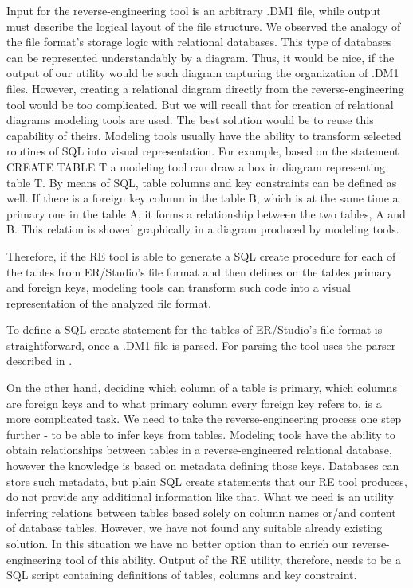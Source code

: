 Input for the reverse-engineering tool is an arbitrary .DM1 file, while output must describe the logical layout of the file structure.
We observed the analogy of the file format's storage logic with relational databases. 
This type of databases can be represented understandably by a diagram.
Thus, it would be nice, if the output of our utility would be such diagram capturing the organization of .DM1 files.
However, creating a relational diagram directly from the reverse-engineering tool would be too complicated. But we will recall that for creation of relational diagrams modeling tools are used. The best solution would be to reuse this capability of theirs.
Modeling tools usually have the ability to transform selected routines of SQL into visual representation.
For example, based on the statement CREATE TABLE T a modeling tool can draw a box in diagram representing table T. 
By means of SQL, table columns and key constraints can be defined as well.
If there is a foreign key column in the table B, which is at the same time a primary one in the table A, it forms a relationship between the two tables, A and B. This relation is showed graphically in a diagram produced by modeling tools.

Therefore, if the RE tool is able to generate a SQL create procedure for each of the tables from ER/Studio's file format and then defines on the tables primary and foreign keys, modeling tools can transform such code into a visual representation of the analyzed file format.

To define a SQL create statement for the tables of ER/Studio's file format is straightforward, once a .DM1 file is parsed. For parsing the tool uses the parser described in .

On the other hand, deciding which column of a table is primary, which columns are foreign keys and to what primary column every foreign key refers to, is a more complicated task.
We need to take the reverse-engineering process one step further - to be able to infer keys from tables.
Modeling tools have the ability to obtain relationships between tables in a reverse-engineered relational database, however the knowledge is based on metadata defining those keys. Databases can store such metadata, but plain SQL create statements that our RE tool produces, do not provide any additional information like that.
What we need is an utility inferring relations between tables based solely on column names or/and content of database tables. However, we have not found any suitable already existing solution.
In this situation we have no better option than to enrich our reverse-engineering tool of this ability.
Output of the RE utility, therefore, needs to be a SQL script containing definitions of tables, columns and key constraint.

